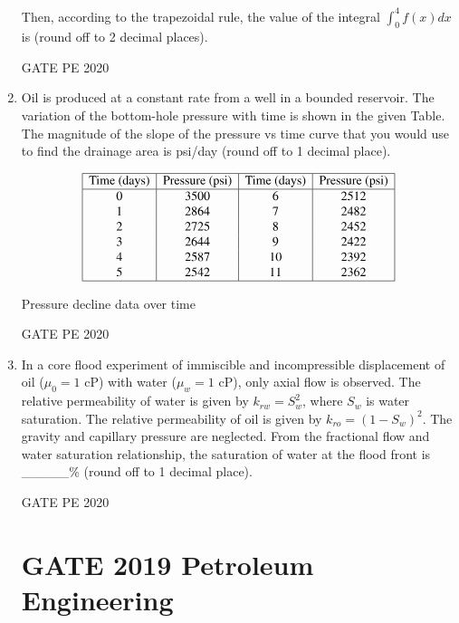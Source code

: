 \documentclass[journal,12pt,onecolumn]{IEEEtran}
\theoremstyle{remark}
\begin{document}
\begin{enumerate}
Then, according to the trapezoidal rule, the value of the integral $\int_{0}^{4} f(x) dx$ is  (round off to 2 decimal places).

   

  \hfill{GATE PE 2020}
   
\item Oil is produced at a constant rate from a well in a bounded reservoir. The variation of the bottom-hole pressure with time is shown in the given Table. The magnitude of the slope of the pressure vs time curve that you would use to find the drainage area is  psi/day (round off to 1 decimal place).

\begin{table}[h!]
\centering
\begin{align*}
\begin{array}{|c|c|c|c|}
\hline
\text{Time (days)} & \text{Pressure (psi)} & \text{Time (days)} & \text{Pressure (psi)} \\
\hline
0 & 3500 & 6 & 2512 \\
1 & 2864 & 7 & 2482 \\
2 & 2725 & 8 & 2452 \\
3 & 2644 & 9 & 2422 \\
4 & 2587 & 10 & 2392 \\
5 & 2542 & 11 & 2362 \\
\hline
\end{array}
\end{align*}
\caption{Pressure decline data over time}
\end{table}


  

  \hfill{GATE PE 2020}
   
\item In a core flood experiment of immiscible and incompressible displacement of oil ($\mu_0 = 1$ cP) with water ($\mu_w = 1$ cP), only axial flow is observed. The relative permeability of water is given by $k_{rw} = S_w^2$, where $S_w$ is water saturation. The relative permeability of oil is given by $k_{ro} = (1 - S_w)^2$. The gravity and capillary pressure are neglected. From the fractional flow and water saturation relationship, the saturation of water at the flood front is \_\_\_\_\_\% (round off to 1 decimal place).

   

  \hfill{GATE PE 2020}
   


\section*{GATE 2019 Petroleum Engineering}





\end{enumerate}
\end{document}
